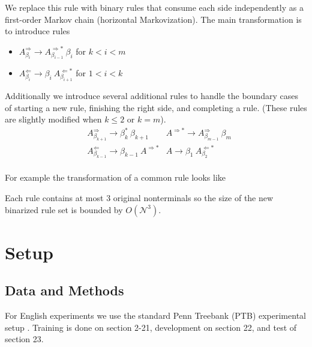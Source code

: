 \documentclass[11pt,letterpaper]{article}
\newcommand{\nonterms}{\mathcal{N}}
\newcommand{\Rule}[3]{#1 \rightarrow #2\ #3}
\newcommand{\RuleA}[3]{#1 \rightarrow #2^*\ #3}
\begin{document}
We replace this rule with binary rules that consume each side
independently as a first-order Markov chain (horizontal Markovization).
The main transformation is to introduce rules

\begin{itemize}

\item
$\Rule{A^{\Rightarrow}_{\beta_i}}{A^{\Rightarrow*}_{\beta_{i-1}}}{\beta_i}$ for $k < i < m$

\item
$\Rule{A^{\Leftarrow}_{\beta_i}} {\beta_i}{A^{\Leftarrow*}_{\beta_{i+1}}} $ for $1< i < k$
\end{itemize}



Additionally we introduce several additional rules to handle the boundary cases of starting a new rule, finishing the right side, and completing a rule. (These rules are slightly modified when $k\leq 2$ or $k=m$).
\begin{align*}
& \RuleA{A^{\Rightarrow}_{\beta_{k+1}}}{\beta_k}{\beta_{k+1}} & \Rule{A^{\Rightarrow*}} {A^{\Rightarrow}_{\beta_{m-1}}}{\beta_m} \\
 &\Rule{A^{\Leftarrow}_{\beta_{k-1}}}{\beta_{k-1}}{A^{\Rightarrow *}} & \Rule{A}{\beta_1}{ A^{\Leftarrow*}_{\beta_{2}}}\\
\end{align*}

\noindent For example the transformation of a common rule looks like

\begin{center}
\end{center}

\noindent Each rule contains at most 3 original nonterminals so the size of the new binarized rule set is bounded by $O(\nonterms^3)$.

\section{Setup}


\subsection{Data and Methods}

For English experiments we use the standard Penn Treebank (PTB)
experimental setup \cite{marcus1993building}. Training is done on
section 2-21, development on section 22, and test of section 23.
\end{document}
